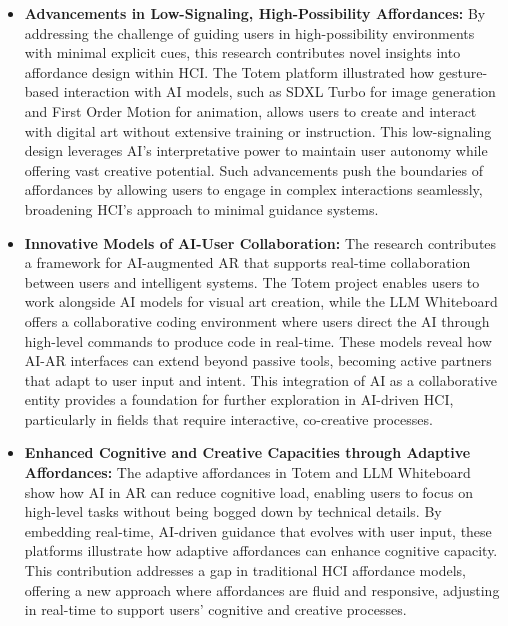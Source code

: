 \begin{itemize}
    \item \textbf{Advancements in Low-Signaling, High-Possibility Affordances:} By addressing the challenge of guiding users in high-possibility environments with minimal explicit cues, this research contributes novel insights into affordance design within HCI.
    The Totem platform illustrated how gesture-based interaction with AI models, such as SDXL Turbo for image generation and First Order Motion for animation, allows users to create and interact with digital art without extensive training or instruction.
    This low-signaling design leverages AI’s interpretative power to maintain user autonomy while offering vast creative potential.
    Such advancements push the boundaries of affordances by allowing users to engage in complex interactions seamlessly, broadening HCI’s approach to minimal guidance systems.

    \item  \textbf{Innovative Models of AI-User Collaboration:} The research contributes a framework for AI-augmented AR that supports real-time collaboration between users and intelligent systems.
    The Totem project enables users to work alongside AI models for visual art creation, while the LLM Whiteboard offers a collaborative coding environment where users direct the AI through high-level commands to produce code in real-time.
    These models reveal how AI-AR interfaces can extend beyond passive tools, becoming active partners that adapt to user input and intent.
    This integration of AI as a collaborative entity provides a foundation for further exploration in AI-driven HCI, particularly in fields that require interactive, co-creative processes.
    
    \item \textbf{Enhanced Cognitive and Creative Capacities through Adaptive Affordances:} The adaptive affordances in Totem and LLM Whiteboard show how AI in AR can reduce cognitive load, enabling users to focus on high-level tasks without being bogged down by technical details.
    By embedding real-time, AI-driven guidance that evolves with user input, these platforms illustrate how adaptive affordances can enhance cognitive capacity.
    This contribution addresses a gap in traditional HCI affordance models, offering a new approach where affordances are fluid and responsive, adjusting in real-time to support users’ cognitive and creative processes.

\end{itemize}

